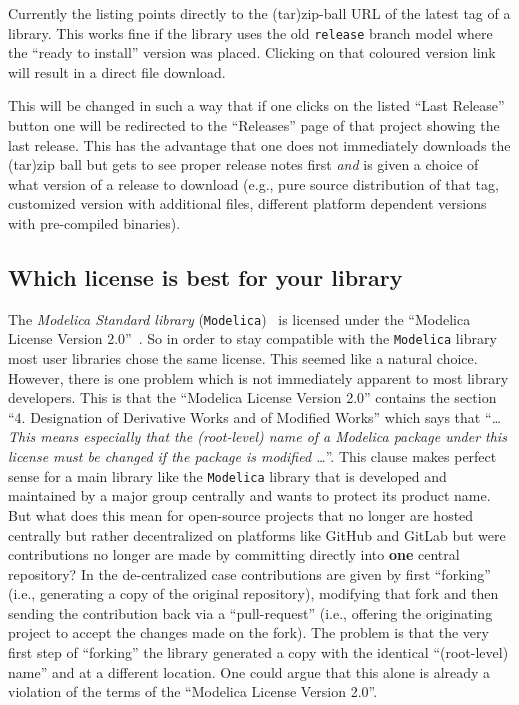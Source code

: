 \documentclass[11pt,a4paper,twocolumn]{article}
\begin{document}
Currently the listing points directly to the (tar)zip-ball URL of the
latest tag of a library. This works fine if the library uses the old
\texttt{release} branch model where the ``ready to install'' version
was placed.  Clicking on that coloured version link will result in a
direct file download.

This will be changed in such a way that if one clicks on the listed
``Last Release'' button one will be redirected to the ``Releases''
page of that project showing the last release. This has the advantage
that one does not immediately downloads the (tar)zip ball but gets to
see proper release notes first \emph{and} is given a choice of what
version of a release to download (e.g., pure source distribution of
that tag, customized version with additional files, different platform
dependent versions with pre-compiled binaries).

\subsection{Which license is best for your library}
The \emph{Modelica Standard library}
(\texttt{Modelica})~\parencite{MSL} is licensed under the ``Modelica
License Version 2.0''~\parencite{MoLic2}. So in order to stay
compatible with the \texttt{Modelica} library most user libraries
chose the same license. This seemed like a natural choice. However,
there is one problem which is not immediately apparent to most library
developers. This is that the ``Modelica License Version 2.0'' contains
the section ``4. Designation of Derivative Works and of Modified
Works'' which says that ``\emph{\ldots This means especially that the
  (root-level) name of a Modelica package under this license must be
  changed if the package is modified \ldots}''.  This clause makes
perfect sense for a main library like the \texttt{Modelica} library
that is developed and maintained by a major group centrally and wants
to protect its product name.  But what does this mean for open-source
projects that no longer are hosted centrally but rather decentralized
on platforms like GitHub and GitLab but were contributions no longer
are made by committing directly into \textbf{one} central repository?
In the de-centralized case contributions are given by first
``forking'' (i.e., generating a copy of the original repository),
modifying that fork and then sending the contribution back via a
``pull-request'' (i.e., offering the originating project to accept the
changes made on the fork).  The problem is that the very first step of
``forking'' the library generated a copy with the identical
``(root-level) name'' and at a different location. One could argue
that this alone is already a violation of the terms of the ``Modelica
License Version 2.0''.
\end{document}
